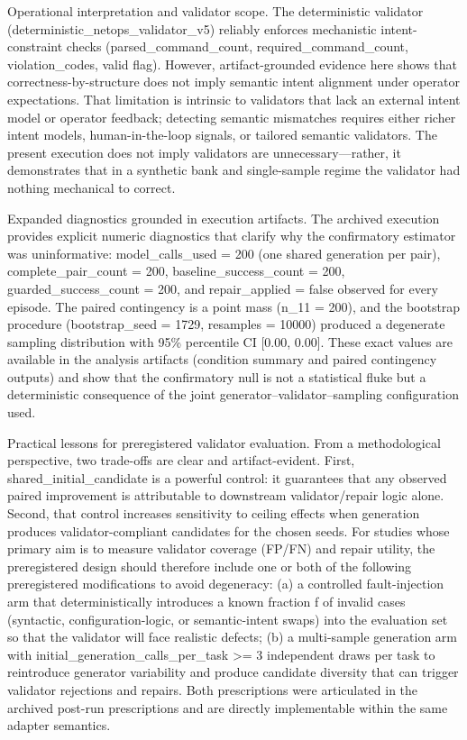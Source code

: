 \documentclass[conference]{IEEEtran}
\begin{document}
Operational interpretation and validator scope. The deterministic validator (deterministic\_netops\_validator\_v5) reliably enforces mechanistic intent-constraint checks (parsed\_command\_count, required\_command\_count, violation\_codes, valid flag). However, artifact-grounded evidence here shows that correctness-by-structure does not imply semantic intent alignment under operator expectations. That limitation is intrinsic to validators that lack an external intent model or operator feedback; detecting semantic mismatches requires either richer intent models, human-in-the-loop signals, or tailored semantic validators. The present execution does not imply validators are unnecessary---rather, it demonstrates that in a synthetic bank and single-sample regime the validator had nothing mechanical to correct.

Expanded diagnostics grounded in execution artifacts. The archived execution provides explicit numeric diagnostics that clarify why the confirmatory estimator was uninformative: model\_calls\_used = 200 (one shared generation per pair), complete\_pair\_count = 200, baseline\_success\_count = 200, guarded\_success\_count = 200, and repair\_applied = false observed for every episode. The paired contingency is a point mass (n\_11 = 200), and the bootstrap procedure (bootstrap\_seed = 1729, resamples = 10000) produced a degenerate sampling distribution with 95\% percentile CI [0.00, 0.00]. These exact values are available in the analysis artifacts (condition summary and paired contingency outputs) and show that the confirmatory null is not a statistical fluke but a deterministic consequence of the joint generator--validator--sampling configuration used.

Practical lessons for preregistered validator evaluation. From a methodological perspective, two trade-offs are clear and artifact-evident. First, shared\_initial\_candidate is a powerful control: it guarantees that any observed paired improvement is attributable to downstream validator/repair logic alone. Second, that control increases sensitivity to ceiling effects when generation produces validator-compliant candidates for the chosen seeds. For studies whose primary aim is to measure validator coverage (FP/FN) and repair utility, the preregistered design should therefore include one or both of the following preregistered modifications to avoid degeneracy: (a) a controlled fault-injection arm that deterministically introduces a known fraction f of invalid cases (syntactic, configuration-logic, or semantic-intent swaps) into the evaluation set so that the validator will face realistic defects; (b) a multi-sample generation arm with initial\_generation\_calls\_per\_task >= 3 independent draws per task to reintroduce generator variability and produce candidate diversity that can trigger validator rejections and repairs. Both prescriptions were articulated in the archived post-run prescriptions and are directly implementable within the same adapter semantics.
\end{document}
